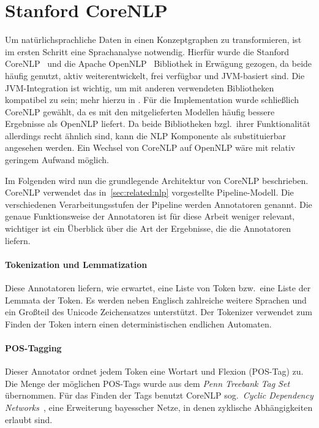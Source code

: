 \section{Stanford CoreNLP}%
\label{sec:theory:nlp}

Um natürlichsprachliche Daten in einen Konzeptgraphen zu transformieren, ist im ersten Schritt eine Sprachanalyse notwendig.
Hierfür wurde die Stanford CoreNLP~\cite{CoreNLP} und die Apache OpenNLP~\cite{OpenNLP} Bibliothek in Erwägung gezogen, da beide häufig genutzt, aktiv weiterentwickelt, frei verfügbar und JVM-basiert sind.
Die JVM-Integration ist wichtig, um mit anderen verwendeten Bibliotheken kompatibel zu sein;
mehr hierzu in .
Für die Implementation wurde schließlich CoreNLP gewählt, da es mit den mitgelieferten Modellen häufig bessere Ergebnisse als OpenNLP liefert.
Da beide Bibliotheken bzgl.\ ihrer Funktionalität allerdings recht ähnlich sind, kann die NLP Komponente als substituierbar angesehen werden.
Ein Wechsel von CoreNLP auf OpenNLP wäre mit relativ geringem Aufwand möglich.

Im Folgenden wird nun die grundlegende Architektur von CoreNLP beschrieben.
CoreNLP verwendet das in~\ref{sec:related:nlp} vorgestellte Pipeline-Modell.
Die verschiedenen Verarbeitungsstufen der Pipeline werden Annotatoren genannt.
Die genaue Funktionsweise der Annotatoren ist für diese Arbeit weniger relevant, wichtiger ist ein Überblick über die Art der Ergebnisse, die die Annotatoren liefern.

\paragraph{Tokenization und Lemmatization}
Diese Annotatoren liefern, wie erwartet, eine Liste von Token bzw.\ eine Liste der Lemmata der Token.
Es werden neben Englisch zahlreiche weitere Sprachen und ein Großteil des Unicode Zeichensatzes unterstützt.
Der Tokenizer verwendet zum Finden der Token intern einen deterministischen endlichen Automaten.

\paragraph{POS-Tagging}
Dieser Annotator ordnet jedem Token eine Wortart und Flexion (POS-Tag) zu.
Die Menge der möglichen POS-Tags wurde aus dem \textit{Penn Treebank Tag Set}~\cite{Santorini1990} übernommen.
Für das Finden der Tags benutzt CoreNLP sog.\ \textit{Cyclic Dependency Networks}~\cite{Toutanova2003}, eine Erweiterung bayesscher Netze, in denen zyklische Abhängigkeiten erlaubt sind.

